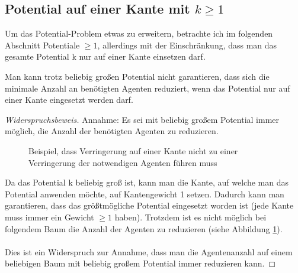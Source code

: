 \subsection{Potential auf einer Kante mit $k \geq 1$}


Um das Potential-Problem etwas zu erweitern, betrachte ich im folgenden Abschnitt Potentiale $\geq 1$, allerdings mit der Einschränkung, dass man das gesamte Potential k nur auf einer Kante einsetzen darf.

\begin{theorem}
	Man kann trotz beliebig großen Potential nicht garantieren, dass sich die minimale Anzahl an benötigten Agenten reduziert, wenn das Potential nur auf einer Kante eingesetzt werden darf.
\end{theorem}

\begin{proof}[Widerspruchsbeweis]
	Annahme: Es sei mit beliebig großem Potential immer möglich, die Anzahl der benötigten Agenten zu reduzieren.
	
	\begin{figure}[hbt]

		\caption{Beispiel, dass Verringerung auf einer Kante nicht zu einer Verringerung der notwendigen Agenten führen muss} 
		\label{abb_gegenbeispielMaxPotential}
	\end{figure} 
	
	
	Da das Potential k beliebig groß ist, kann man die Kante, auf welche man das Potential anwenden möchte, auf Kantengewicht 1 setzen. Dadurch kann man garantieren, dass das größtmögliche Potential eingesetzt worden ist (jede Kante muss immer ein Gewicht $\geq 1$ haben). Trotzdem ist es nicht möglich bei folgendem Baum die Anzahl der Agenten zu reduzieren (siehe Abbildung \ref{abb_gegenbeispielMaxPotential}).
	\\
	\\
	Dies ist ein Widerspruch zur Annahme, dass man die Agentenanzahl auf einem beliebigen Baum mit beliebig großem Potential immer reduzieren kann.
\end{proof}

